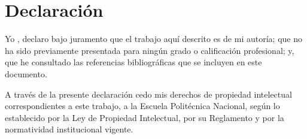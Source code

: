 \chapter*{Declaración}

Yo \theauthor, declaro bajo juramento que el  trabajo aquí descrito es de mi
autoría; que no ha sido previamente presentada para ningún grado o calificación
profesional; y, que he consultado las referencias bibliográficas que se
incluyen en este documento.

A través de la presente declaración cedo mis derechos de propiedad intelectual
correspondientes a este trabajo, a la Escuela Politécnica Nacional, según lo
establecido por la Ley de Propiedad Intelectual, por su Reglamento y por la
normatividad institucional vigente.
